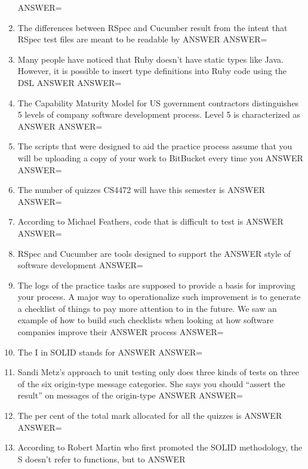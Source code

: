 \documentclass{exam}
\begin{document}
\begin{enumerate}
ANSWER=
\item The differences between RSpec and Cucumber result from the intent that RSpec test files are meant to be readable by ANSWER\newline
ANSWER=
\item Many people have noticed that Ruby doesn't have static types like Java.  However, it is possible to insert type definitions into Ruby code using the DSL ANSWER\newline
ANSWER=
\item The Capability Maturity Model for US government contractors distinguishes 5 levels of company software development process.  Level 5 is characterized as ANSWER\newline
ANSWER=
\item The scripts that were designed to aid the practice process assume that you will be uploading a copy of your work to BitBucket every time you ANSWER\newline
ANSWER=
\item The number of quizzes CS4472 will have this semester is ANSWER\newline
ANSWER=
\item According to Michael Feathers, code that is difficult to test is ANSWER\newline
ANSWER=
\item RSpec and Cucumber are tools designed to support the ANSWER style of software development\newline
ANSWER=
\item The logs of the practice tasks are supposed to provide a basis for improving your process.  A major way to operationalize such improvement is to generate a checklist of things to pay more attention to in the future.  We saw an example of how to build such checklists when looking at how software companies improve their ANSWER process\newline
ANSWER=
\item The I in SOLID stands for ANSWER\newline
ANSWER=
\item Sandi Metz's approach to unit testing only does three kinds of tests on three of the six origin-type message categories.  She says you should ``assert the result'' on messages of the origin-type ANSWER\newline
ANSWER=
\item The per cent of the total mark allocated for all the quizzes is ANSWER\newline
ANSWER=
\item According to Robert Martin who first promoted the SOLID methodology, the S doesn't refer to functions, but to ANSWER\newline

\end{enumerate}
\end{document}
